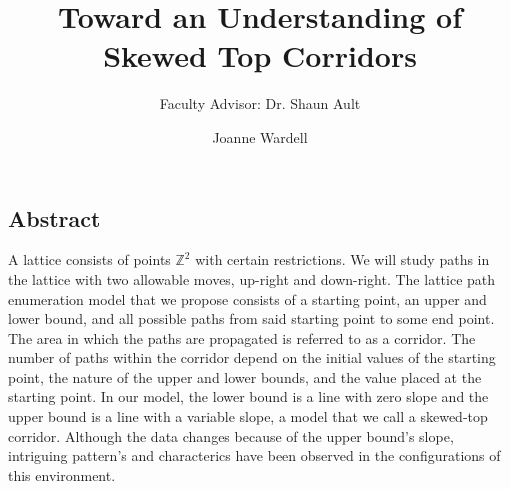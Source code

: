 \documentclass{article}
\title{Toward an Understanding of Skewed Top Corridors}
\author{Faculty Advisor: Dr. Shaun Ault}
\date{Joanne Wardell}
\newcommand*{\set}[1]{\mathbb{#1}}
\newcommand\tab[1][1cm]{\hspace*{#1}}
\begin{document}
\maketitle
\begin{center}
  \subsection*{Abstract}
\end{center}


\tab A lattice consists of points $\set{Z}^{2}$ with certain restrictions. We will study paths in the lattice with two allowable moves, 
up-right and down-right. The lattice path enumeration model that we propose 
consists of a starting point, an upper and lower bound, and all possible paths from said starting point to some end point.
 The area in which the paths are propagated is referred to as a corridor. The number of paths 
within the corridor depend on the initial values of the starting point, the nature of the upper and lower
 bounds, and the value placed at the starting point. In our model, the lower bound is a line with zero slope 
and the upper bound is a line with a variable slope, a model that we call a skewed-top corridor. Although the data changes 
because of the upper bound's slope, intriguing pattern's and characterics have been observed 
in the configurations of this environment.
\end{document}
